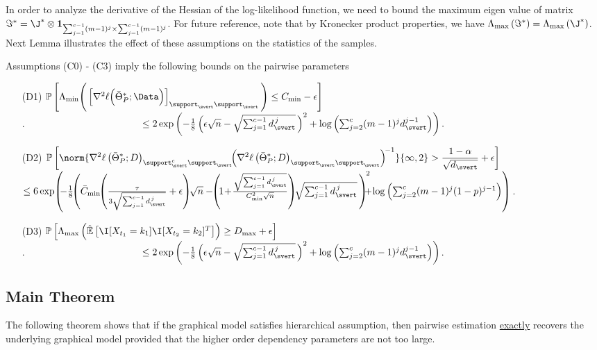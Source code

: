 \noindent In order to analyze the derivative of the Hessian of the log-likelihood function, we need to bound the maximum eigen value of matrix $\Im^*=\J^*\otimes \mathbf{1}_{\sum_{j=1}^{c-1}(m-1)^j\times\sum_{j=1}^{c-1}(m-1)^j}$. For future reference, note that by Kronecker product properties, we have $\Lambda_{\max}\left(\Im^*\right)=\Lambda_{\max}\left(\J^*\right)$. Next Lemma illustrates the effect of these assumptions on the statistics of the samples.

\begin{lemma}
Assumptions (C0) - (C3) imply the following bounds on the pairwise parameters
\begin{itemize}
\item [(D1)] $\mathbb{P}\left[\Lambda_{\min}\Bigg(\left[\nabla^2\ell\Big(\bar{\Theta}^*_P;\Data\Big)\right]_{\support_\svert\support_\svert}\Bigg)\leq C_{\min}-\epsilon\right]$\\ .$\qquad\qquad\qquad\qquad\qquad\qquad\leq 2\exp\left(-\frac{1}{8}\left(\epsilon\sqrt{n}-\sqrt{\sum_{j=1}^{c-1}d_\svert^{\,j}}\,\right)^2 +\log\left(\sum_{j=2}^{c}(m-1)^jd_\svert^{j-1}\right)\right).$

\item [(D2)] $\displaystyle\mathbb{P}\left[\norm{\nabla^2\ell\left(\bar{\Theta}^*_P;D\right)_{\support_\svert^c\support_\svert}\!\! \left(\nabla^2\ell\left(\bar{\Theta}^*_P;D\right)_{\support_\svert\support_\svert}\right)^{\!-1}}{\infty,2} > \frac{1-\alpha}{\sqrt{d_\svert}}+\epsilon\right]$\\
$\leq 6\exp\!\left(\!\!-\frac{1}{8}\!\!\left(\bar{C}_{\min}\!\!\left(\frac{\tau}{3\sqrt{\sum_{j=1}^{c-1}d_\svert^{\,j}}}+\epsilon\right)\!\!\sqrt{n} -\!\!\left(\!1\!+\!\frac{\sqrt{\sum_{j=1}^{c-1}d_\svert^{\,j}}}{C_{\min}^2\sqrt{n}}\right) \!\!\sqrt{\sum_{j=1}^{c-1}d_\svert^{\,j}}\,\right)^{\!2}\!\!\!\!\! +\!\log\left(\sum_{j=2}^c(m-1)^j(1-p)^{j-1}\right)\right)$.

\item [(D3)] $\mathbb{P}\left[\Lambda_{\max}\left(\hat{\mathbb{E}}\left[\I[X_{t_1}=k_1]\I[X_{t_2}=k_2]^T\right]\right)
\geq D_{\max}+\epsilon\right]$\\ .$\qquad\qquad\qquad\qquad\qquad\qquad\leq 2\exp\left(-\frac{1}{8}\left(\epsilon\sqrt{n}-\sqrt{\sum_{j=1}^{c-1}d_\svert^{\,j}}\,\right)^2 +\log\left(\sum_{j=2}^{c}(m-1)^jd_\svert^{j-1}\right)\right)$.
\end{itemize}
\label{concentration_clique}
\end{lemma}

\subsection{Main Theorem}
\noindent The following theorem shows that if the graphical model satisfies hierarchical assumption, then pairwise estimation \underline{exactly} recovers the underlying graphical model provided that the higher order dependency parameters are not too large.

